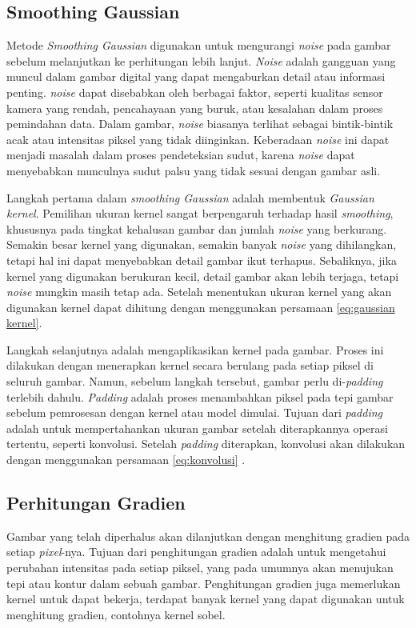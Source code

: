 \subsection{Smoothing Gaussian}
    Metode \emph{Smoothing Gaussian} digunakan untuk mengurangi \emph{noise} pada gambar sebelum melanjutkan ke perhitungan lebih lanjut.
\emph{Noise} adalah gangguan yang muncul dalam gambar digital yang dapat mengaburkan detail atau informasi penting. \emph{noise} dapat disebabkan oleh berbagai faktor, seperti kualitas sensor kamera yang rendah, pencahayaan yang buruk, atau kesalahan dalam proses pemindahan data.
Dalam gambar, \emph{noise} biasanya terlihat sebagai bintik-bintik acak atau intensitas piksel yang tidak diinginkan. Keberadaan \emph{noise} ini dapat menjadi masalah dalam proses pendeteksian sudut, karena \emph{noise} dapat menyebabkan munculnya sudut palsu yang tidak sesuai dengan gambar asli.
    
    Langkah pertama dalam \emph{smoothing Gaussian} adalah membentuk \emph{Gaussian kernel}. Pemilihan ukuran kernel sangat berpengaruh terhadap hasil \emph{smoothing}, khususnya pada tingkat kehalusan gambar dan jumlah \emph{noise} yang berkurang.
Semakin besar kernel yang digunakan, semakin banyak \emph{noise} yang dihilangkan, tetapi hal ini dapat menyebabkan detail gambar ikut terhapus. Sebaliknya, jika kernel yang digunakan berukuran kecil, detail gambar akan lebih terjaga, tetapi \emph{noise} mungkin masih tetap ada.
Setelah menentukan ukuran kernel yang akan digunakan kernel dapat dihitung dengan menggunakan persamaan \eqref{eq:gaussian kernel}.

    Langkah selanjutnya adalah mengaplikasikan kernel pada gambar. Proses ini dilakukan dengan menerapkan kernel secara berulang pada setiap piksel di seluruh gambar.
Namun, sebelum langkah tersebut, gambar perlu di-\emph{padding} terlebih dahulu. \emph{Padding} adalah proses menambahkan piksel pada tepi gambar sebelum pemrosesan dengan kernel atau model dimulai.
Tujuan dari \emph{padding} adalah untuk mempertahankan ukuran gambar setelah diterapkannya operasi tertentu, seperti konvolusi. 
Setelah \emph{padding} diterapkan, konvolusi akan dilakukan dengan menggunakan persamaan \eqref{eq:konvolusi} . 

\subsection{Perhitungan Gradien}
    Gambar yang telah diperhalus akan dilanjutkan dengan menghitung gradien pada setiap \emph{pixel}-nya. Tujuan dari penghitungan gradien adalah untuk mengetahui perubahan intensitas pada setiap piksel, yang pada umumnya akan menujukan tepi atau kontur dalam sebuah gambar.
Penghitungan gradien juga memerlukan kernel untuk dapat bekerja, terdapat banyak kernel yang dapat digunakan untuk menghitung gradien, contohnya kernel sobel. 

